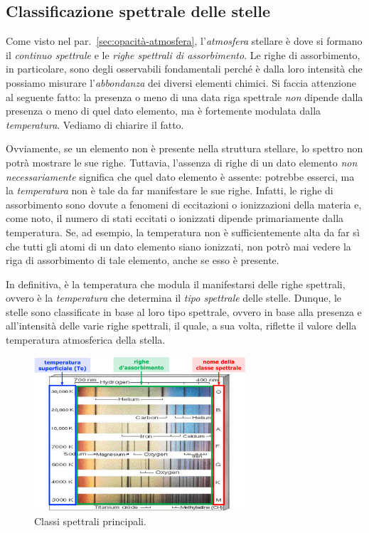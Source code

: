 \subsection{Classificazione spettrale delle stelle}
Come visto nel par.~\ref{sec:opacità-atmosfera}, l'\emph{atmosfera} stellare è dove si formano il \emph{continuo spettrale} e le \emph{righe spettrali di assorbimento}. Le righe di assorbimento, in particolare, sono degli osservabili fondamentali perché è dalla loro intensità che possiamo misurare l'\emph{abbondanza} dei diversi elementi chimici. Si faccia attenzione al seguente fatto: la presenza o meno di una data riga spettrale \emph{non} dipende dalla presenza o meno di quel dato elemento, ma è fortemente modulata dalla \emph{temperatura}. Vediamo di chiarire il fatto.

Ovviamente, se un elemento non è presente nella struttura stellare, lo spettro non potrà mostrare le sue righe. Tuttavia, l'assenza di righe di un dato elemento \emph{non necessariamente} significa che quel dato elemento è assente: potrebbe esserci, ma la \emph{temperatura} non è tale da far manifestare le sue righe. Infatti, le righe di assorbimento sono dovute a fenomeni di eccitazioni o ionizzazioni della materia e, come noto,  il numero di stati eccitati o ionizzati dipende primariamente dalla temperatura. Se, ad esempio, la temperatura non è sufficientemente alta da far sì che tutti gli atomi di un dato elemento siano ionizzati, non potrò mai vedere la riga di assorbimento di tale elemento, anche se esso è presente.

In definitiva, è la temperatura che modula il manifestarsi delle righe spettrali, ovvero è la \emph{temperatura} che determina il \emph{tipo spettrale} delle stelle. Dunque, le stelle sono classificate in base al loro tipo spettrale, ovvero in base alla presenza e all'intensità delle varie righe spettrali, il quale, a sua volta, riflette il valore della temperatura atmosferica della stella.

\begin{figure}
    \centering
    \includegraphics[width=0.7\textwidth]{immagini/classificazione-spettrale-stelle.png}
    \caption{Classi spettrali principali.}
    \label{fig:classificazione-spettrale-stelle}
\end{figure}

